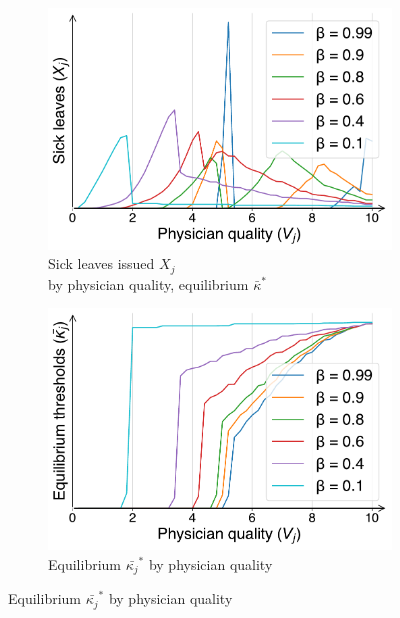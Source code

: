 \documentclass[../main.tex]{subfiles}
\begin{document}
\begin{figure}[H]
    \vspace{0.5cm}

    \begin{subfigure}[b]{0.46\linewidth}
        \centering
        \includegraphics[width=\linewidth]{schnell_X.pdf}
        \vspace{-0.6cm}
        \caption{Sick leaves issued $X_j$ \\ by physician quality, equilibrium $\bar{\kappa}^*$}
        \label{fig:SchnellX}
    \end{subfigure}
    \hspace{0.05\linewidth}  %
    \begin{subfigure}[b]{0.46\linewidth}
        \centering
        \includegraphics[width=\linewidth]{schnell_ks.pdf}
        \vspace{-0.6cm}
        \caption{Equilibrium $\bar{\kappa_j}^*$ by physician quality \\ \text{}}
        \label{fig:Schnellk}
    \end{subfigure}


\end{figure}
\end{document}
